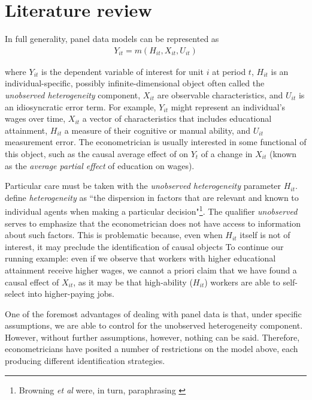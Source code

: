 \section{Literature review}

In full generality, panel data models can be represented as
\begin{align}
  Y_{it} = m(H_{it}, X_{it}, U_{it}) \label{eq:full_generality_panel}
\end{align}

\noindent where $Y_{it}$ is the dependent variable of interest for unit $i$ at period $t$, $H_{it}$ is an individual-specific, possibly infinite-dimensional object often called the \emph{unobserved heterogeneity} component, $X_{it}$ are observable characteristics, and $U_{it}$ is an idiosyncratic error term. For example, $Y_{it}$ might represent an individual's wages over time, $X_{it}$ a vector of characteristics that includes educational attainment, $H_{it}$ a measure of their cognitive or manual ability, and $U_{it}$ measurement error. The econometrician is usually interested in some functional of this object, such as the causal average effect of on $Y_{t}$ of a change in $X_{it}$ (known as the \emph{average partial effect} of education on wages). 

Particular care must be taken with the \emph{unobserved heterogeneity} parameter $H_{it}$. \citet[~p.2]{browning2007heterogeneity} define \emph{heterogeneity} as ``the dispersion in factors that are relevant and known to individual agents when making a particular decision"\footnote{Browning \textit{et al} were, in turn, paraphrasing \cite{cunha2005separating}}. The qualifier \emph{unobserved} serves to emphasize that the econometrician does not have access to information about such factors. This is problematic because, even when $H_{it}$ itself is not of interest, it may preclude the identification of causal objects To continue our running example: even if we observe that workers with higher educational attainment receive higher wages, we cannot a priori claim that we have found a causal effect of $X_{it}$, as it may be that high-ability ($H_{it}$) workers are able to self-select into higher-paying jobs.

One of the foremost advantages of dealing with panel data is that, under specific assumptions, we are able to control for the unobserved heterogeneity component. However, without further assumptions, however, nothing can be said. Therefore, econometricians have posited a number of restrictions on the model above, each producing different identification strategies.

